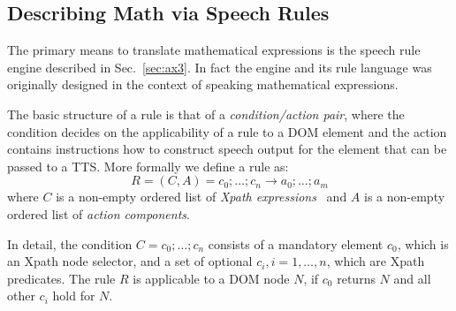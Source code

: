\documentclass{sig-alternate}
\begin{document}
\subsection{Describing Math via Speech Rules}

\newcommand{\srule}[2]{\ensuremath{#1 \rightarrow #2}}
\newcommand{\slist}[1]{\ensuremath{#1}}
\newcommand{\ttrule}[2]{
  
  \noindent\centerline{\texttt{#1}$\rightarrow$\texttt{#2}}}
\newcommand{\tttrule}[2]{

  \noindent
  \texttt{#1}\newline\hspace*{\fill}$\longrightarrow$\texttt{#2}

}
\def\cR{{\cal R}} \def\cN{{\cal N}} \def\assign#1#2{{#1}\leftarrow{#2}} 


The primary means to translate mathematical expressions is the speech rule
engine described in Sec.~\ref{sec:ax3}. In fact the engine and its rule language
was originally designed in the context of speaking mathematical expressions.

The basic structure of a rule is that of a \emph{condition/action pair}, where
the condition decides on the applicability of a rule to a DOM element and the
action contains instructions how to construct speech output for the element
that can be passed to a TTS. More formally we define a rule as:
\[R= ({C},{A}) = \srule{\slist{c_0;\ldots;c_n}}{\slist{a_0;\ldots;a_m}} \] where
$C$ is a non-empty ordered list of \emph{Xpath expressions}~\cite{clark1999xpl} and
$A$ is a non-empty ordered list of \emph{action components}.

In detail, the condition $C=\slist{c_0;\ldots;c_n}$ consists of a mandatory
element $c_0$, which is an Xpath node selector, and a set of optional $c_i,
i=1,\ldots,n$, which are Xpath predicates. The rule $R$ is applicable to a DOM
node $N$, if $c_0$ returns $N$ and all other $c_i$ hold for $N$.
\end{document}
